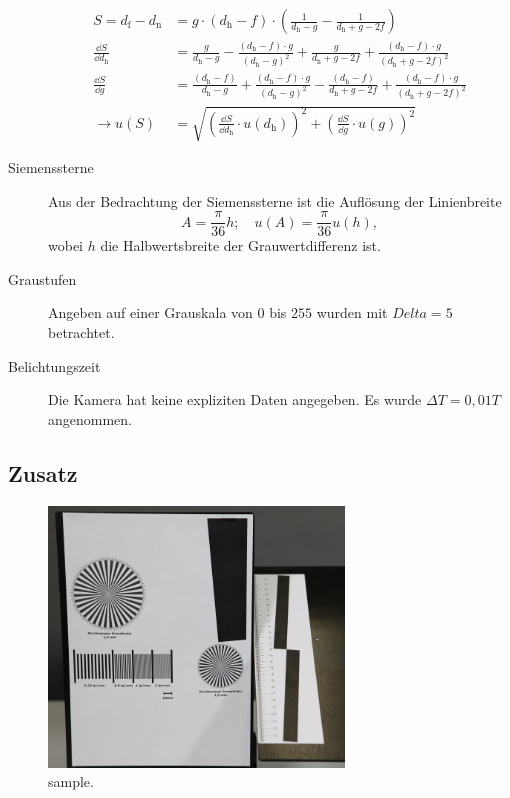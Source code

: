 \begin{description}
		\begin{align}
			S = d_\text{f} - d_\text{n} &= g\cdot (d_\text{h}-f) \cdot \left( \frac{1}{d_\text{h} - g} - \frac{1}{d_\text{h} + g -2f} \right) \\
			\frac{\dd S}{\dd d_\text{h}} &= \frac{g}{d_\text{h} - g} - \frac{(d_\text{h} - f)\cdot g}{(d_\text{h} - g)^2} + \frac{g}{d_\text{h} + g - 2f} + \frac{(d_\text{h} - f)\cdot g}{(d_\text{h} + g - 2f)^2} \\
			\frac{\dd S}{\dd g} &= \frac{(d_\text{h} - f)}{d_\text{h} - g} + \frac{(d_\text{h} - f)\cdot g}{(d_\text{h} - g)^2} - \frac{(d_\text{h} - f)}{d_\text{h} + g - 2f} + \frac{(d_\text{h} - f)\cdot g}{(d_\text{h} + g - 2f)^2} \\
			\rightarrow u(S) &= \sqrt{\left( \frac{\dd S}{\dd d_\text{h}} \cdot u(d_\text{h}) \right)^2 + \left( \frac{\dd S}{\dd g} \cdot u(g) \right)^2 }
		\end{align}
	
		\item[Siemenssterne] Aus der Bedrachtung der Siemenssterne ist die Auflösung der Linienbreite 
		\begin{equation}
			A = \frac{\pi }{36} h; \quad u(A) = \frac{\pi}{36} u(h),
		\end{equation}
		wobei $h$ die Halbwertsbreite der Grauwertdifferenz ist.
		
		\item[Graustufen] Angeben auf einer Grauskala von $0$ bis $255$ wurden mit $Delta = 5$ betrachtet.
		
		\item[Belichtungszeit] Die Kamera hat keine expliziten Daten angegeben.
		Es wurde $\Delta T = 0,01 T$ angenommen.
		
	\end{description}

\subsection{Zusatz}\label{subsec:Zusatz}

\begin{figure}[ht]
	\centering
	\includegraphics[width=0.7\textwidth]{bilder/testbild.png}
	\caption{sample.\cite{WWU}}
	\label{fig:testbild}	
\end{figure}	